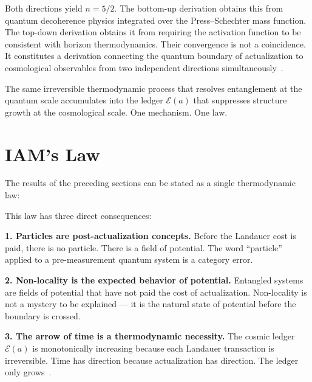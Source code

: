 \documentclass[12pt,a4paper]{article}
\begin{document}
Both directions yield $n = 5/2$. The bottom-up derivation obtains this
from quantum decoherence physics integrated over the Press--Schechter
mass function. The top-down derivation obtains it from requiring the
activation function to be consistent with horizon thermodynamics. Their
convergence is not a coincidence. It constitutes a derivation connecting
the quantum boundary of actualization to cosmological observables from
two independent directions simultaneously~\citep{IAM_Zurek}.

The same irreversible thermodynamic process that resolves entanglement at
the quantum scale accumulates into the ledger $\mathcal{E}(a)$ that
suppresses structure growth at the cosmological scale. One mechanism. One
law.

\section{IAM's Law}
\label{sec:law}

The results of the preceding sections can be stated as a single
thermodynamic law:

\medskip
\noindent{}
\medskip

This law has three direct consequences:

\textbf{1. Particles are post-actualization concepts.} Before the
Landauer cost is paid, there is no particle. There is a field of
potential. The word ``particle'' applied to a pre-measurement quantum
system is a category error.

\textbf{2. Non-locality is the expected behavior of potential.}
Entangled systems are fields of potential that have not paid the cost of
actualization. Non-locality is not a mystery to be explained --- it is
the natural state of potential before the boundary is crossed.

\textbf{3. The arrow of time is a thermodynamic necessity.} The cosmic
ledger $\mathcal{E}(a)$ is monotonically increasing because each
Landauer transaction is irreversible. Time has direction because
actualization has direction. The ledger only grows~\citep{IAM_time}.
\end{document}

